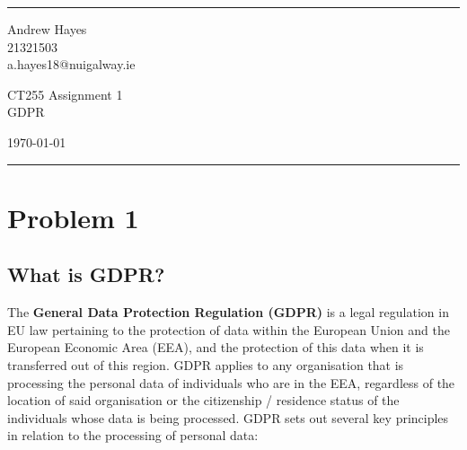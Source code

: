 \documentclass[a4paper]{article}
\begin{document}

\fancyhead[C]{}
\hrule \medskip %
\begin{minipage}{0.295\textwidth} 
\raggedright
\footnotesize
Andrew Hayes \hfill\\   
21321503 \hfill\\
a.hayes18@nuigalway.ie
\end{minipage}
\begin{minipage}{0.4\textwidth} 
\centering 
\large 
CT255 Assignment 1\\ 
\normalsize 
GDPR\\ 
\end{minipage}
\begin{minipage}{0.295\textwidth} 
\raggedleft
\today\hfill\\
\end{minipage}
\medskip\hrule 
\bigskip


\section{Problem 1}
\subsection{What is GDPR?}
The \textbf{General Data Protection Regulation (GDPR)} is a legal regulation in EU law pertaining to the protection of data within the European Union and the European Economic Area (EEA), and the protection of this data when it is transferred out of this region. GDPR applies to any organisation that is processing the personal data of individuals who are in the EEA, regardless of the location of said organisation or the citizenship / residence status of the individuals whose data is being processed. GDPR sets out several key principles in relation to the processing of personal data:
\end{document}

